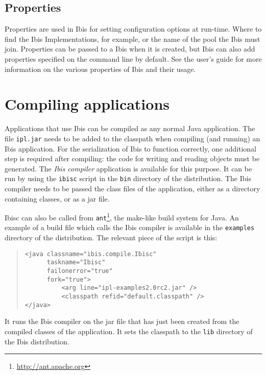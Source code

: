\documentclass[10pt]{article}
\begin{document}
\subsection{Properties}
\label{properties}

Properties are used in Ibis for setting configuration options at
run-time. Where to find the Ibis Implementations, for example, or the name
of the pool the Ibis must join. Properties can be passed to a Ibis when it is
created, but Ibis can also add properties specified on the command line
by default. See the user's guide for more information on the various
properties of Ibis and their usage.

\section{Compiling applications}
\label{compiling}


Applications that use Ibis can be compiled as any normal Java
application. The file \texttt{ipl.jar} needs to be added to the
classpath when compiling (and running) an Ibis application. For the
serialization of Ibis to function correctly, one additional step is
required after compiling: the code for writing and reading objects must
be generated. The \emph{Ibis compiler} application is available for
this purpose. It can be run by using the \texttt{ibisc}
script in the \texttt{bin} directory of the distribution. The Ibis
compiler needs to be passed the class files of the application, either
as a directory containing classes, or as a jar file.

Ibisc can also be called from
\texttt{ant}\footnote{\url{http://ant.apache.org}}, the make-like build
system for Java. An example of a build file which calls the Ibis
compiler is available in the \texttt{examples} directory of the
distribution. The relevant piece of the script is this:

\begin{quote}
\begin{verbatim}
<java classname="ibis.compile.Ibisc"
      taskname="Ibisc"
      failonerror="true"
      fork="true">
          <arg line="ipl-examples2.0rc2.jar" />
          <classpath refid="default.classpath" />
</java>
\end{verbatim}
\end{quote}

It runs the Ibis compiler on the jar file that has just been created
from the compiled classes of the application. It sets the classpath to
the \texttt{lib} directory of the Ibis distribution.
\end{document}
